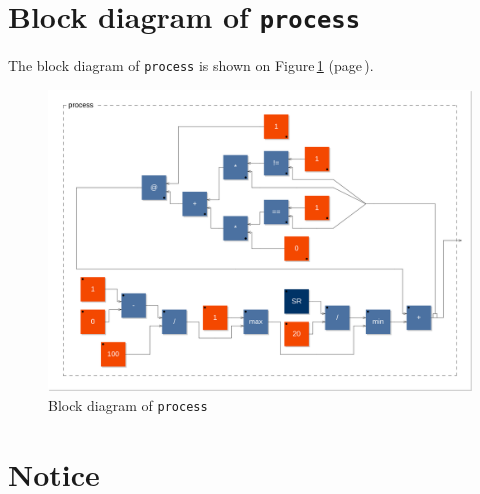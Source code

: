 \documentclass{article}
\begin{document}
\section{Block diagram of \texttt{process}}
\label{diagram}

The block diagram of \texttt{process} is shown on Figure\,\ref{figure1} (page\,\pageref{figure1}).
\begin{figure}[ht!]
	\centering
	\includegraphics[width=\textwidth]{../svg/svg-01/process}
	\caption{Block diagram of \texttt{process}}
	\label{figure1}
\end{figure}


\section{Notice}
\label{notice}
\end{document}
